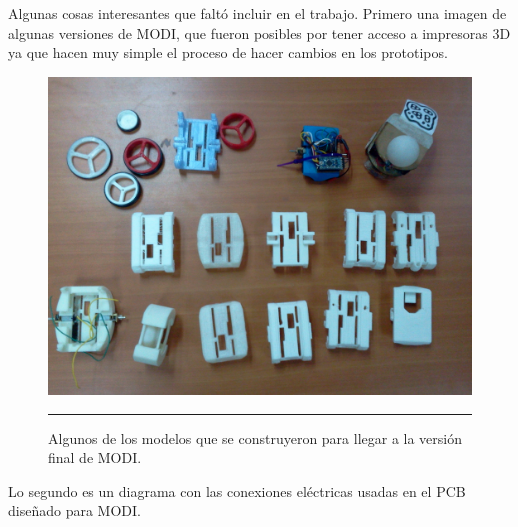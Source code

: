 
\chapter{} %

\label{AppendixA} %


Algunas cosas interesantes que faltó incluir en el trabajo. Primero una imagen de algunas versiones de MODI, que fueron posibles por tener acceso a impresoras 3D ya que hacen muy simple el proceso de hacer cambios en los prototipos.

\begin{figure}[htbp]
	\centering
\includegraphics[width=\textwidth]{./Pictures/historia.jpg}
		\rule{35em}{0.5pt}
	\caption[Historia de construcción]{Algunos de los modelos que se construyeron para llegar a la versión final de MODI.}
	\label{fig:Historia}
\end{figure}
Lo segundo es un diagrama con las conexiones eléctricas usadas en el PCB diseñado para MODI.
